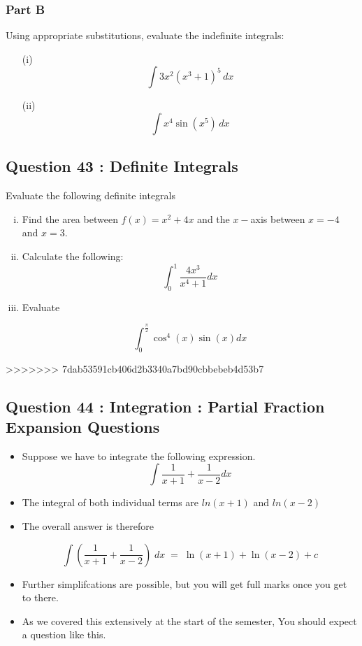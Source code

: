 \documentclass[]{article}
\begin{document}
\subsubsection*{Part B}
Using appropriate substitutions, evaluate the indefinite integrals:
\begin{multicols}{2}
	\begin{itemize}
		
		\item[(i)]	
		\[\int 3x^2 (x^3+1)^5 \, dx\]
		
		\item[(ii)]
		\[\int x^4 \sin(x^5) \, dx\]
	\end{itemize}
\end{multicols}
\bigskip



\subsection*{Question 43 : Definite Integrals}
Evaluate the following definite integrals 

\begin{enumerate}[(i)]
	
	\item 
	Find the area between $f(x) = x^2 + 4x $ and the $x-$axis between 
	$x=-4$   and $ x=3$.
	
	\item Calculate the following:
	\[ \int^{1}_{0} \frac{4x^3}{x^4+1} dx \]
	
	
	\item Evaluate 
	
	\[ \int^{\frac{\pi}{2}}_{0} \cos^4(x) \sin(x) dx \]
\end{enumerate}

>>>>>>> 7dab53591cb406d2b3340a7bd90cbbebeb4d53b7

\subsection*{Question 44 : Integration : Partial Fraction Expansion Questions}
\begin{itemize}
	\item Suppose we have to integrate the following expression.
	\[\int \frac {1}{x+1} +\frac{1}{x-2} dx \]
	\item The integral of both individual terms are $ ln (x+1) $ and $ln (x-2) $
	
	\item The overall answer is therefore 
	
	\[ \int \left( \frac{1}{x+1} +\frac{1}{x-2}\right)\; dx \; =\; \ln (x+1) + \ln (x-2) + c\]
	
	\item Further simplifcations are possible, but you will get full marks once you get to there.
	\item As we covered this extensively at the start of the semester, You should expect a question like this.
\end{itemize}
\end{document}
